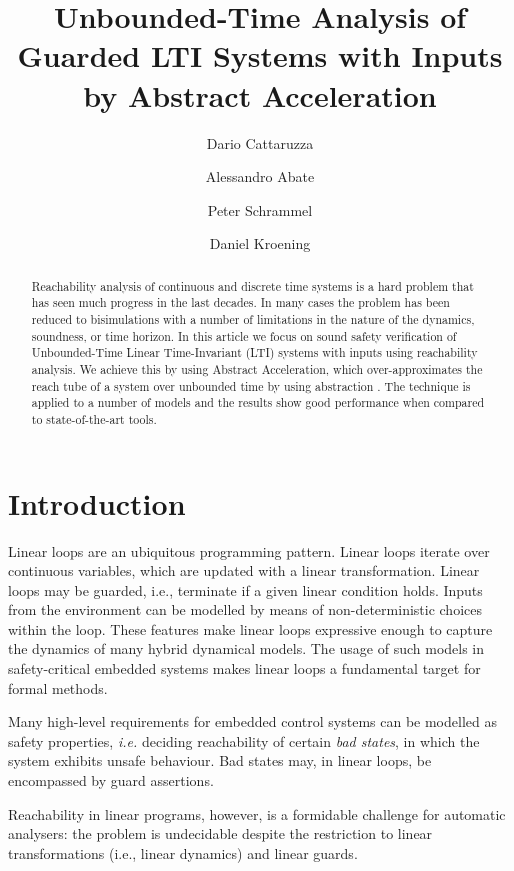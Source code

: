 \documentclass{IEEEtran}
\title{{Unbounded-Time Analysis of\jrronly{ Continuous} Guarded LTI Systems with Inputs by\jrronly{ Counterexample Guided} Abstract Acceleration }}
\author{Dario Cattaruzza \and Alessandro Abate \and Peter Schrammel \and Daniel Kroening}
\newcommand{\jrronly}[1]{{}}
\begin{document}
\maketitle

\begin{abstract}
Reachability analysis of continuous and discrete time systems is a hard problem that has seen much progress in the last decades.
In many cases the problem has been reduced to bisimulations with a number of limitations in the nature of the dynamics, soundness, or time horizon. In this article we focus on sound safety verification of Unbounded-Time Linear Time-Invariant (LTI) systems with inputs \jrronly{for both continuous and discrete time} using reachability analysis. We achieve this by using \jrronly{Counterexample-Guided} Abstract Acceleration, which over-approximates the reach tube of a system over unbounded time by using abstraction \jrronly{and finding concrete counterexamples for abstraction refinement based on the safety specification}. The technique is applied to a number of \jrronly{discrete and continuous} models and the results show good performance when compared to state-of-the-art tools.
\end{abstract}

\section{Introduction} \label{sec:intro}


Linear loops are an ubiquitous programming pattern. Linear loops iterate
over continuous variables, which are updated with a linear transformation. 
Linear loops may be guarded, i.e., terminate if a given linear condition
holds.  Inputs from the environment can be modelled by means of
non-deterministic choices within the loop.  These features make linear loops
expressive enough to capture the dynamics of many hybrid dynamical models. 
The usage of such models in safety-critical embedded systems makes linear
loops a fundamental target for formal methods.

Many high-level requirements for embedded control systems can be modelled as
safety properties, \emph{i.e.} deciding reachability of certain \emph{bad
states}, in which the system exhibits unsafe behaviour.  Bad states may, in
linear loops, be encompassed by guard assertions.  

Reachability in linear programs, however, is a formidable challenge for automatic analysers:
the problem is undecidable despite the restriction to linear transformations
(i.e., linear dynamics) and linear guards.  
\end{document}

